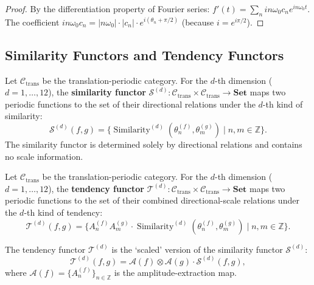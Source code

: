 \begin{proof}
By the differentiation property of Fourier series: $f'(t) = \sum_n i n \omega_0 c_n e^{i n \omega_0 t}$. The coefficient $i n \omega_0 c_n = |n\omega_0| \cdot |c_n| \cdot e^{i(\theta_n + \pi/2)}$ (because $i = e^{i\pi/2}$).
\end{proof}

\subsection{Similarity Functors and Tendency Functors}

\begin{definition}\label{def:similarity_functor}
Let $\mathcal{C}_{\text{trans}}$ be the translation-periodic category. For the $d$-th dimension ($d = 1,\dots,12$), the \textbf{similarity functor} $\mathcal{S}^{(d)}: \mathcal{C}_{\text{trans}} \times \mathcal{C}_{\text{trans}} \to \mathbf{Set}$ maps two periodic functions to the set of their directional relations under the $d$-th kind of similarity:
\[
\mathcal{S}^{(d)}(f, g) = \{\operatorname{Similarity}^{(d)}(\theta_n^{(f)}, \theta_m^{(g)}) \mid n, m \in \mathbb{Z}\}.
\]
The similarity functor is determined solely by directional relations and contains no scale information.
\end{definition}

\begin{definition}\label{def:tendency_functor}
Let $\mathcal{C}_{\text{trans}}$ be the translation-periodic category. For the $d$-th dimension ($d = 1,\dots,12$), the \textbf{tendency functor} $\mathcal{T}^{(d)}: \mathcal{C}_{\text{trans}} \times \mathcal{C}_{\text{trans}} \to \mathbf{Set}$ maps two periodic functions to the set of their combined directional-scale relations under the $d$-th kind of tendency:
\[
\mathcal{T}^{(d)}(f, g) = \{A_n^{(f)} A_m^{(g)} \cdot \operatorname{Similarity}^{(d)}(\theta_n^{(f)}, \theta_m^{(g)}) \mid n, m \in \mathbb{Z}\}.
\]
\end{definition}

\begin{proposition}\label{prop:similarity_tendency_functor_relation}
The tendency functor $\mathcal{T}^{(d)}$ is the `scaled' version of the similarity functor $\mathcal{S}^{(d)}$:
\[
\mathcal{T}^{(d)}(f, g) = \mathcal{A}(f) \otimes \mathcal{A}(g) \cdot \mathcal{S}^{(d)}(f, g),
\]
where $\mathcal{A}(f) = \{A_n^{(f)}\}_{n \in \mathbb{Z}}$ is the amplitude-extraction map.
\end{proposition}

